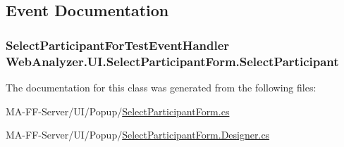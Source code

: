 \subsection{Event Documentation}
\hypertarget{class_web_analyzer_1_1_u_i_1_1_select_participant_form_af1734ad8760e4e4f42579efafcb7299d}{}
\subsubsection[{Select\+Participant}]{\setlength{\rightskip}{0pt plus 5cm}Select\+Participant\+For\+Test\+Event\+Handler Web\+Analyzer.\+U\+I.\+Select\+Participant\+Form.\+Select\+Participant}\label{class_web_analyzer_1_1_u_i_1_1_select_participant_form_af1734ad8760e4e4f42579efafcb7299d}


The documentation for this class was generated from the following files\+:\begin{DoxyCompactItemize}
\item 
M\+A-\/\+F\+F-\/\+Server/\+U\+I/\+Popup/\hyperlink{_select_participant_form_8cs}{Select\+Participant\+Form.\+cs}\item 
M\+A-\/\+F\+F-\/\+Server/\+U\+I/\+Popup/\hyperlink{_select_participant_form_8_designer_8cs}{Select\+Participant\+Form.\+Designer.\+cs}\end{DoxyCompactItemize}
